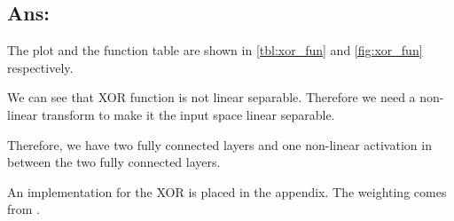 \documentclass{kthreport}
\begin{document}
\subsection*{Ans:}
The plot and the function table are shown in \cref{tbl:xor_fun} and \cref{fig:xor_fun}
respectively.

We can see that XOR function is not linear separable. Therefore we need a non-linear
transform to make it the input space linear separable.

Therefore, we have two fully connected layers and one non-linear activation in between
the two fully connected layers.

An implementation for the XOR is placed in the appendix.
The weighting comes from \cite{Goodfellow-deeplearning-book}.
\begin{figure}[!h]
    \begin{floatrow}

    \end{floatrow}
\end{figure}
\end{document}
